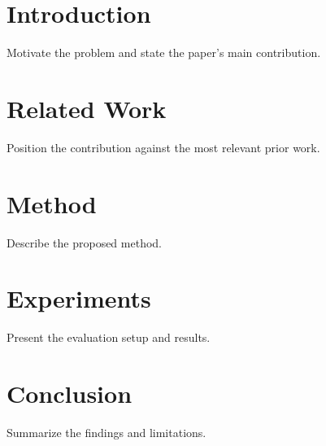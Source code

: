 \documentclass{article}
\begin{document}

\printAffiliationsAndNotice{}

\begin{abstract}
Briefly summarize the problem, method, and main result.
\end{abstract}

\section{Introduction}
Motivate the problem and state the paper's main contribution.

\section{Related Work}
Position the contribution against the most relevant prior work.

\section{Method}
Describe the proposed method.

\section{Experiments}
Present the evaluation setup and results.

\section{Conclusion}
Summarize the findings and limitations.



\end{document}
